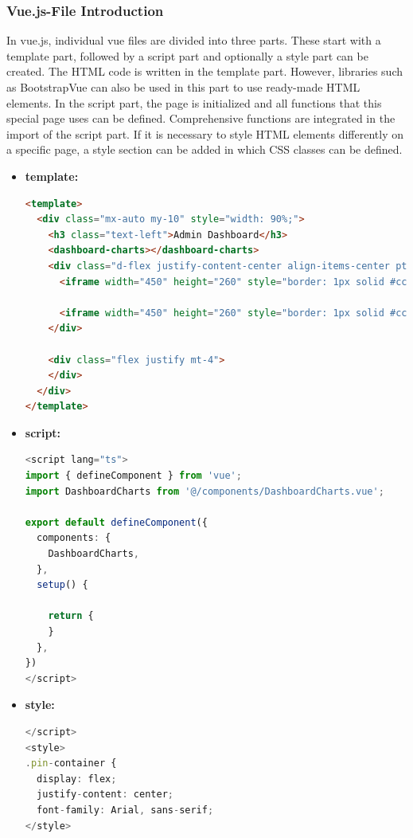 \subsubsection{Vue.js-File Introduction}
In vue.js, individual vue files are divided into three parts. These start with a template part, followed by a script part and optionally a style part can be created.
The HTML code is written in the template part. However, libraries such as BootstrapVue can also be used in this part to use ready-made HTML elements. In the script part, the page is initialized and all functions that this special page uses can be defined. Comprehensive functions are integrated in the import of the script part. If it is necessary to style HTML elements differently on a specific page, a style section can be added in which CSS classes can be defined.
\begin{itemize}
\item \textbf{template:}
\begin{lstlisting}[language=HTML]
<template>
  <div class="mx-auto my-10" style="width: 90%;">
    <h3 class="text-left">Admin Dashboard</h3>
    <dashboard-charts></dashboard-charts>
    <div class="d-flex justify-content-center align-items-center pt-10">
      <iframe width="450" height="260" style="border: 1px solid #cccccc;" src="https://thingspeak.com/channels/2530450/widgets/852176"></iframe>

      <iframe width="450" height="260" style="border: 1px solid #cccccc;" src="https://thingspeak.com/channels/2530450/charts/1?bgcolor=%23ffffff&color=%23d62020&dynamic=true&results=60&title=History+of+Wattage&type=line"></iframe>
    </div>

    <div class="flex justify mt-4">
    </div>
  </div>
</template>
    \end{lstlisting}

\item \textbf{script:}
\begin{lstlisting}[language=TypeScript]
<script lang="ts">
import { defineComponent } from 'vue';
import DashboardCharts from '@/components/DashboardCharts.vue';

export default defineComponent({
  components: {
    DashboardCharts,
  },
  setup() {

    return {
    }
  },
})
</script>
    \end{lstlisting}
\item \textbf{style:}
\begin{lstlisting}[language=TypeScript]
</script>
<style>
.pin-container {
  display: flex;
  justify-content: center;
  font-family: Arial, sans-serif;
</style>
    \end{lstlisting}
\end{itemize}

